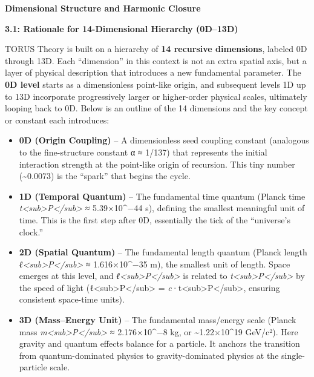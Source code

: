 \textbf{Dimensional Structure and Harmonic Closure}

\textbf{3.1: Rationale for 14-Dimensional Hierarchy (0D--13D)}

TORUS Theory is built on a hierarchy of \textbf{14 recursive
dimensions}, labeled 0D through 13D. Each ``dimension'' in this context
is not an extra spatial axis, but a layer of physical description that
introduces a new fundamental parameter. The \textbf{0D level} starts as
a dimensionless point-like origin, and subsequent levels 1D up to 13D
incorporate progressively larger or higher-order physical scales,
ultimately looping back to 0D. Below is an outline of the 14 dimensions
and the key concept or constant each introduces:

\begin{itemize}
\item
  \textbf{0D (Origin Coupling)} -- A dimensionless seed coupling
  constant (analogous to the fine-structure constant α ≈ 1/137) that
  represents the initial interaction strength at the point-like origin
  of recursion​. This tiny number (\textasciitilde{}0.0073) is the
  ``spark'' that begins the cycle.
\item
  \textbf{1D (Temporal Quantum)} -- The fundamental time quantum (Planck
  time
  \emph{t\textless{}sub\textgreater{}P\textless{}/sub\textgreater{}} ≈
  5.39×10\^{}−44 s), defining the smallest meaningful unit of time. This
  is the first step after 0D, essentially the tick of the ``universe's
  clock.''
\item
  \textbf{2D (Spatial Quantum)} -- The fundamental length quantum
  (Planck length
  \emph{ℓ\textless{}sub\textgreater{}P\textless{}/sub\textgreater{}} ≈
  1.616×10\^{}−35 m), the smallest unit of length​. Space emerges at
  this level, and
  \emph{ℓ\textless{}sub\textgreater{}P\textless{}/sub\textgreater{}} is
  related to
  \emph{t\textless{}sub\textgreater{}P\textless{}/sub\textgreater{}} by
  the speed of light
  (ℓ\textless{}sub\textgreater{}P\textless{}/sub\textgreater{} =
  \emph{c}·t\textless{}sub\textgreater{}P\textless{}/sub\textgreater{},
  ensuring consistent space-time units).
\item
  \textbf{3D (Mass--Energy Unit)} -- The fundamental mass/energy scale
  (Planck mass
  \emph{m\textless{}sub\textgreater{}P\textless{}/sub\textgreater{}} ≈
  2.176×10\^{}−8 kg, or \textasciitilde{}1.22×10\^{}19 GeV/c²)​. Here
  gravity and quantum effects balance for a particle. It anchors the
  transition from quantum-dominated physics to gravity-dominated physics
  at the single-particle scale.

\end{itemize}
